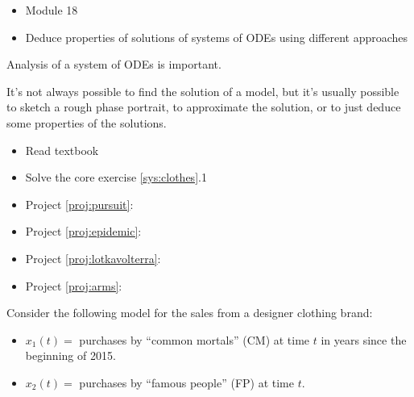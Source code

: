 \begin{lesson}

	\begin{itemize}
		\item Module 18
	\end{itemize}

	\begin{itemize}
		\item Deduce properties of solutions of systems of ODEs using different approaches
	\end{itemize}
	

Analysis of a system of ODEs is important.

It's not always possible to find the solution of a model, but it's usually possible to sketch a rough phase portrait, to approximate the solution, or to just deduce some properties of the solutions.


\begin{itemize}
	\item Read textbook
	\item Solve the core exercise \ref{sys:clothes}.1
\end{itemize}


\begin{itemize}
	\item Project \ref{proj:pursuit}: \pursuittitle
	\item Project \ref{proj:epidemic}: \epidemictitle
	\item Project \ref{proj:lotkavolterra}: \lotkavolterratitle
	\item Project \ref{proj:arms}: \armstitle
\end{itemize}



\end{lesson}




\question \label{sys:clothes}
	Consider the following model for the sales from a designer clothing brand:
	\begin{itemize}
	\item $x_1(t) = $ purchases by ``common mortals'' (CM) at time $t$ in years since the beginning of 2015.
	\item $x_2(t) = $ purchases by ``famous people'' (FP) at time $t$.
	\end{itemize}
	
